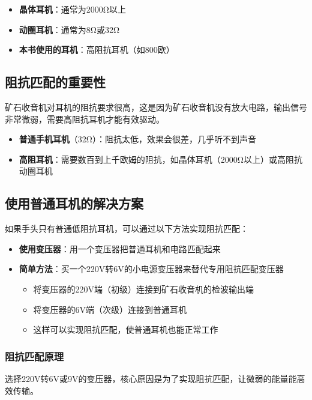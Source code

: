 \documentclass[12pt,UTF8]{ctexbook}
\begin{document}
\begin{itemize}[leftmargin=3.5em]
\item \textbf{晶体耳机}：通常为2000Ω以上
\item \textbf{动圈耳机}：通常为8Ω或32Ω
\item \textbf{本书使用的耳机}：高阻抗耳机（如800欧）
\end{itemize}

\subsection{阻抗匹配的重要性}

矿石收音机对耳机的阻抗要求很高，这是因为矿石收音机没有放大电路，输出信号非常微弱，需要高阻抗耳机才能有效驱动。

\begin{itemize}[leftmargin=3.5em]
\item \textbf{普通手机耳机}（32Ω）：阻抗太低，效果会很差，几乎听不到声音
\item \textbf{高阻耳机}：需要数百到上千欧姆的阻抗，如晶体耳机（2000Ω以上）或高阻抗动圈耳机
\end{itemize}

\subsection{使用普通耳机的解决方案}

如果手头只有普通低阻抗耳机，可以通过以下方法实现阻抗匹配：

\begin{itemize}[leftmargin=3.5em]
\item \textbf{使用变压器}：用一个变压器把普通耳机和电路匹配起来
\item \textbf{简单方法}：买一个220V转6V的小电源变压器来替代专用阻抗匹配变压器
    \begin{itemize}[leftmargin=3.5em]
    \item 将变压器的220V端（初级）连接到矿石收音机的检波输出端
    \item 将变压器的6V端（次级）连接到普通耳机
    \item 这样可以实现阻抗匹配，使普通耳机也能正常工作
    \end{itemize}
\end{itemize}

\subsubsection{阻抗匹配原理}

选择220V转6V或9V的变压器，核心原因是为了实现阻抗匹配，让微弱的能量能高效传输。
\end{document}
